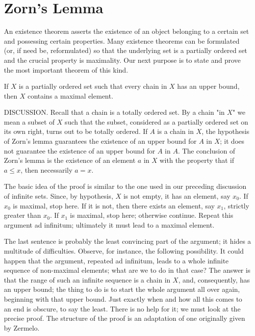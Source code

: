 
\chapter{Zorn's Lemma}

An existence theorem asserts the existence of an object belonging to a certain set and possessing certain properties. Many existence theorems can be formulated (or, if need be, reformulated) so that the underlying set is a partially ordered set and the crucial property is maximality. Our next purpose is to state and prove the most important theorem of this kind.

\begin{named} If $X$ is a partially ordered set such that every chain in $X$ has an upper bound, then $X$ contains a maximal element. 
\end{named}

DISCUSSION. Recall that a chain is a totally ordered set. By a chain "in $X$" we mean a subset of $X$ such that the subset, considered as a partially ordered set on its own right, turns out to be totally ordered. If $A$ is a chain in $X$, the hypothesis of Zorn's lemma guarantees the existence of an upper bound for $A$ in $X$; it does not guarantee the existence of an upper bound for $A$ in $A$. The conclusion of Zorn's lemma is the existence of an element $a$ in $X$ with the property that if $a \le x$, then necessarily $a = x$. 

The basic idea of the proof is similar to the one used in our preceding discussion of infinite sets. Since, by hypothesis, $X$ is not empty, it has an element, say $x_{0}$. If $x_{0}$ is maximal, stop here. If it is not, then there exists an element, say $x_{1}$, strictly greater than $x_{0}$. If $x_{1}$ is maximal, stop here; otherwise continue. Repeat this argument ad infinitum; ultimately it must lead to a maximal element. 

The last sentence is probably the least convincing part of the argument; it hides a multitude of difficulties. Observe, for instance, the following possibility. It could happen that the argument, repeated ad infinitum, leads to a whole infinite sequence of non-maximal elements; what are we to do in that case? The answer is that the range of such an infinite sequence is a chain in $X$, and, consequently, has an upper bound; the thing to do is to start the whole argument all over again, beginning with that upper bound. Just exactly when and how all this comes to an end is obscure, to say the least. There is no help for it; we must look at the precise proof. The structure of the proof is an adaptation of one originally given by Zermelo. 


